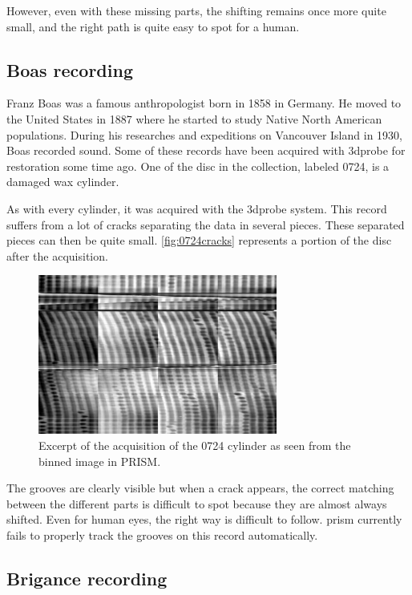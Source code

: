 However, even with these missing parts, the shifting remains once more quite small, and the right path is quite easy to spot for a human.

\subsection{Boas recording}

Franz Boas was a famous anthropologist born in 1858 in Germany. He moved to the United States in 1887 where he started to study Native North American populations. During his researches and expeditions on Vancouver Island in 1930, Boas recorded sound. Some of these records have been acquired with \gls{3dprobe} for restoration some time ago. One of the disc in the collection, labeled 0724, is a damaged wax cylinder.

As with every cylinder, it was acquired with the \gls{3dprobe} system. This record suffers from a lot of cracks separating the data in several pieces. These separated pieces can then be quite small. \autoref{fig:0724cracks} represents a portion of the disc after the acquisition.

\begin{figure}[!ht]
\centering
\includegraphics[width=0.7\textwidth]{images/0724-cracks}
\caption{Excerpt of the acquisition of the 0724 cylinder as seen from the binned image in PRISM.}
\label{fig:0724cracks}
\end{figure}

The grooves are clearly visible but when a crack appears, the correct matching between the different parts is difficult to spot because they are almost always shifted. Even for human eyes, the right way is difficult to follow. \gls{prism} currently fails to properly track the grooves on this record automatically.

\subsection{Brigance recording}

